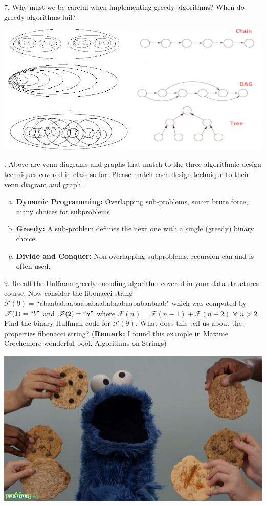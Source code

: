 \documentclass[12pt]{article}
\begin{document}
7. Why must we be careful when implementing greedy algorithms? When do greedy algorithms fail?
\newpage
\centerline{\includegraphics[scale = 2]{prob3.jpg}}
. Above are venn diagrams and graphs that match to the three algorithmic design techniques covered in class so far. 
Please match each design technique to their venn diagram and graph.
\begin{enumerate}[a)]
    \item \textbf{Dynamic Programming:} Overlapping sub-problems, smart brute force, many choices for subproblems
    \item \textbf{Greedy:} A sub-problem defiines the next one with a single (greedy) binary choice.
    \item \textbf{Divide and Conquer:} Non-overlapping subproblems, recursion can and is often used.
\end{enumerate}
9. Recall the Huffman greedy encoding algorithm covered in your data structures course.
Now consider the fibonacci string \\$\mathscr{F}(9) = $``abaababaabaababaababaabaababaabaab" which was computed by $\mathscr{F}(1) = ``b"$ and $\mathscr{F}(2) = ``a"$ where
$\mathscr{F}(n) = \mathscr{F}(n-1) + \mathscr{F}(n-2)$ $\forall$ $n > 2$. Find the binary Huffman code for $\mathscr{F}(9)$. What does this tell us about the properties fibonacci string? 
(\textbf{Remark:} I found this example in Maxime Crochemore wonderful book Algorithms on Strings)
\newpage
\centerline{\includegraphics[width=\textwidth]{cookies.jpg}}
\end{document}
